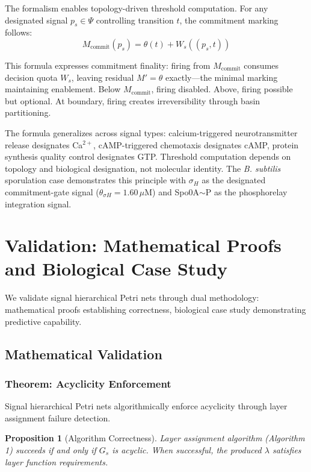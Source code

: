 \documentclass[10pt,letterpaper]{article}
\newtheorem{proposition}{Proposition}
\begin{document}
The formalism enables topology-driven threshold computation. For any designated signal $p_s \in \Psi$ controlling transition $t$, the commitment marking follows:
\begin{equation}
M_{\text{commit}}(p_s) = \theta(t) + W_s((p_s,t))
\end{equation}

This formula expresses commitment finality: firing from $M_{\text{commit}}$ consumes decision quota $W_s$, leaving residual $M' = \theta$ exactly---the minimal marking maintaining enablement. Below $M_{\text{commit}}$, firing disabled. Above, firing possible but optional. At boundary, firing creates irreversibility through basin partitioning.

The formula generalizes across signal types: calcium-triggered neurotransmitter release designates Ca$^{2+}$, cAMP-triggered chemotaxis designates cAMP, protein synthesis quality control designates GTP. Threshold computation depends on topology and biological designation, not molecular identity. The \textit{B. subtilis} sporulation case demonstrates this principle with $\sigma_H$ as the designated commitment-gate signal ($\theta_{\sigma H} = 1.60\,\mu$M) and Spo0A$\sim$P as the phosphorelay integration signal.

\section{Validation: Mathematical Proofs and Biological Case Study}\label{sec:validation}

We validate signal hierarchical Petri nets through dual methodology: mathematical proofs establishing correctness, biological case study demonstrating predictive capability.

\subsection{Mathematical Validation}

\subsubsection{Theorem: Acyclicity Enforcement}

Signal hierarchical Petri nets algorithmically enforce acyclicity through layer assignment failure detection.

\begin{proposition}[Algorithm Correctness]
Layer assignment algorithm (Algorithm 1) succeeds if and only if $G_s$ is acyclic. When successful, the produced $\lambda$ satisfies layer function requirements.
\end{proposition}
\end{document}
